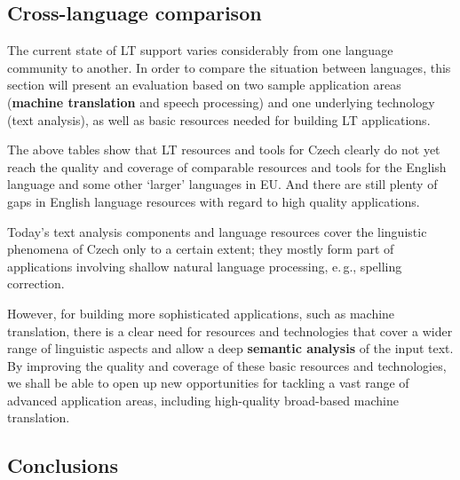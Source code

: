 \begin{multicols}{2}
\subsection{Cross-language comparison}
    The current state of LT support varies considerably from one language community to another. In order to compare the situation between languages, this section will present an evaluation based on two sample application areas (\textbf{machine translation} and speech processing) and one underlying technology (text analysis), as well as basic resources needed for building LT applications.

The above tables show that LT resources and tools for Czech clearly do not yet reach the quality and coverage of comparable resources and tools for the English language and some other ‘larger’ languages in EU. And there are still plenty of gaps in English language resources with regard to high quality applications.

Today’s text analysis components and language resources cover the linguistic phenomena of Czech only to a certain extent; they mostly form part of applications involving shallow natural language processing, e.\,g., spelling correction.

However, for building more sophisticated applications, such as machine translation, there is a clear need for resources and technologies that cover a wider range of linguistic aspects and allow a deep \textbf{semantic analysis} of the input text. By improving the quality and coverage of these basic resources and technologies, we shall be able to open up new opportunities for tackling a vast range of advanced application areas, including high-quality broad-based machine translation.

\subsection{Conclusions}


\end{multicols}

